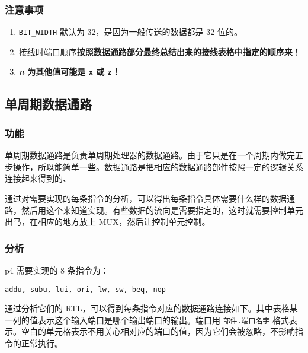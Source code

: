 \hypertarget{ux6ce8ux610fux4e8bux9879-6}{%
\subsubsection{注意事项}\label{ux6ce8ux610fux4e8bux9879-6}}

\begin{enumerate}
\def\labelenumi{\arabic{enumi}.}
\tightlist
\item
  \texttt{BIT\_WIDTH} 默认为 32，是因为一般传送的数据都是 32 位的。
\item
  接线时端口顺序\textbf{按照数据通路部分最终总结出来的接线表格中指定的顺序来！}
\item
  \textbf{\emph{n} 为其他值可能是 \texttt{x} 或 \texttt{z}！}
\end{enumerate}

\hypertarget{ux5355ux5468ux671fux6570ux636eux901aux8def}{%
\subsection{单周期数据通路}\label{ux5355ux5468ux671fux6570ux636eux901aux8def}}

\hypertarget{ux529fux80fd-11}{%
\subsubsection{功能}\label{ux529fux80fd-11}}

单周期数据通路是负责单周期处理器的数据通路。由于它只是在一个周期内做完五步操作，所以能简单一些。数据通路是把相应的数据通路部件按照一定的逻辑关系连接起来得到的、

通过对需要实现的每条指令的分析，可以得出每条指令具体需要什么样的数据通路，然后用这个来知道实现。有些数据的流向是需要指定的，这时就需要控制单元出马，在相应的地方放上
MUX，然后让控制单元控制。

\hypertarget{ux5206ux6790}{%
\subsubsection{分析}\label{ux5206ux6790}}

p4 需要实现的 8 条指令为：

\texttt{addu,\ subu,\ lui,\ ori,\ lw,\ sw,\ beq,\ nop}

通过分析它们的
RTL，可以得到每条指令对应的数据通路连接如下。其中表格某一列的值表示这个输入端口是哪个输出端口的输出。端口用
\texttt{部件.端口名字}
格式表示。空白的单元格表示不用关心相对应的端口的值，因为它们会被忽略，不影响指令的正常执行。

